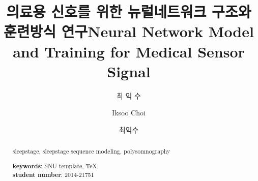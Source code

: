 \documentclass[doctor]{snuee}
\title[korean]{의료용 신호를 위한 뉴럴네트워크 구조와 훈련방식 연구}
\title[english]{Neural Network Model and Training for Medical Sensor Signal}
\author[korean]{최 익 수}
\author[english]{Iksoo Choi}
\author[nospace]{최익수}
\begin{document}
\renewcommand{\baselinestretch}{1.5}    %
\selectfont                             %

\begin{abstract}
	\par %
	sleepstage, sleepstage sequence modeling, polysomnography
	
	\vfill
	\begin{minipage}[t][20mm][b]{\textwidth}
		{\bfseries keywords}: SNU template, TeX\\
		{\bfseries student number}: 2014-21751\\
	\end{minipage}
	
\end{abstract}

\changepage{5mm}{}{}{}{}{}{}{}{-5mm}    %
\makelists   %


%












%
%

%
\end{document}
